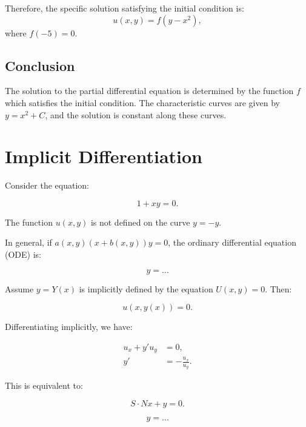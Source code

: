 \documentclass[11pt]{article}
\begin{document}
Therefore, the specific solution satisfying the initial condition is:
\[
u(x, y) = f(y - x^2),
\]
where \( f(-5) = 0 \).

\subsection*{Conclusion}

The solution to the partial differential equation is determined by the function \( f \) which satisfies the initial condition. The characteristic curves are given by \( y = x^2 + C \), and the solution is constant along these curves.



\clearpage

\section*{Implicit Differentiation}

Consider the equation:

\begin{equation}
1 + xy = 0.
\end{equation}

The function \( u(x, y) \) is not defined on the curve \( y = -y \).

In general, if \( a(x, y)(x + b(x, y))y = 0 \), the ordinary differential equation (ODE) is:

\begin{equation}
y = \ldots
\end{equation}

Assume \( y = Y(x) \) is implicitly defined by the equation \( U(x, y) = 0 \). Then:

\begin{equation}
u(x, y(x)) = 0.
\end{equation}

Differentiating implicitly, we have:

\begin{align}
u_x + y' u_y &= 0, \\
y' &= -\frac{u_x}{u_y}.
\end{align}

This is equivalent to:

\begin{equation}
S \cdot Nx + y = 0.
\end{equation}

\begin{equation}
y = \ldots
\end{equation}
\end{document}
